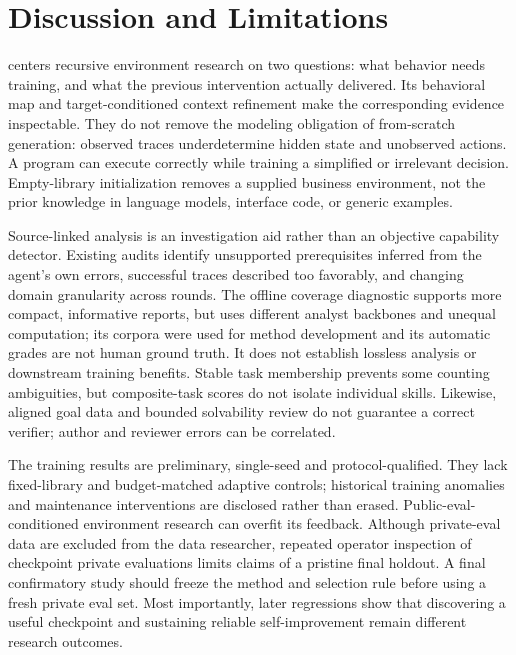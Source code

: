 \section{Discussion and Limitations}
\label{sec:discussion}
\label{app:limitations}

\method{} centers recursive environment research on two questions: what behavior needs training, and what the previous intervention actually delivered. Its behavioral map and target-conditioned context refinement make the corresponding evidence inspectable. They do not remove the modeling obligation of from-scratch generation: observed traces underdetermine hidden state and unobserved actions. A program can execute correctly while training a simplified or irrelevant decision. Empty-library initialization removes a supplied business environment, not the prior knowledge in language models, interface code, or generic examples.

Source-linked analysis is an investigation aid rather than an objective capability detector. Existing audits identify unsupported prerequisites inferred from the agent's own errors, successful traces described too favorably, and changing domain granularity across rounds. The offline coverage diagnostic supports more compact, informative reports, but uses different analyst backbones and unequal computation; its corpora were used for method development and its automatic grades are not human ground truth. It does not establish lossless analysis or downstream training benefits. Stable task membership prevents some counting ambiguities, but composite-task scores do not isolate individual skills. Likewise, aligned goal data and bounded solvability review do not guarantee a correct verifier; author and reviewer errors can be correlated.

The training results are preliminary, single-seed and protocol-qualified. They lack fixed-library and budget-matched adaptive controls; historical training anomalies and maintenance interventions are disclosed rather than erased. Public-eval-conditioned environment research can overfit its feedback. Although private-eval data are excluded from the data researcher, repeated operator inspection of checkpoint private evaluations limits claims of a pristine final holdout. A final confirmatory study should freeze the method and selection rule before using a fresh private eval set. Most importantly, later regressions show that discovering a useful checkpoint and sustaining reliable self-improvement remain different research outcomes.
